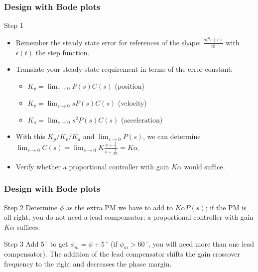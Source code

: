 \begin{frame}
	\frametitle{Design with Bode plots}
	\begin{block}{Step 1}
		\begin{itemize}
			\item Remember the steady state error for references of the shape: $\frac{at^n\epsilon(\tau)}{n!}$ with $\epsilon(t)$ the step function.
			\item Translate your steady state requirement in terms of the error constant:
			\begin{itemize}
				\item $K_p = \lim_{s \to 0} P(s)C(s)$ (position)
				\item $K_v = \lim_{s \to 0} sP(s)C(s)$ (velocity)
				\item $K_a = \lim_{s \to 0} s^2P(s)C(s)$ (acceleration)
			\end{itemize}
			\item With this $K_p/K_v/K_a$ and $\lim_{s \to 0} P(s)$, we can determine $\lim_{s \to 0}C(s) = \lim_{s \to 0} K\frac{s + \frac{1}{\tau}}{s + \frac{1}{\alpha\tau}} = K\alpha$.
			\item Verify whether a proportional controller with gain $K\alpha$ would suffice.
		\end{itemize}
	\end{block}
\end{frame}

\begin{frame}
	\frametitle{Design with Bode plots}
	\begin{block}{Step 2}
		Determine $\phi$ as the extra PM we have to add to  $K\alpha P(s)$; if the PM is all right, you do not need a lead compensator; a proportional controller with gain $K\alpha$ suffices.
	\end{block}
	\begin{block}{Step 3}
		Add $5\,^{\circ}$ to get $\phi_m = \phi + 5\,^{\circ}$ (if $\phi_m > 60\,^{\circ}$, you will need more than one lead compensator). The addition of the lead compensator shifts the gain crossover frequency to the right and decreases the
		phase margin.
	\end{block}
\end{frame}

